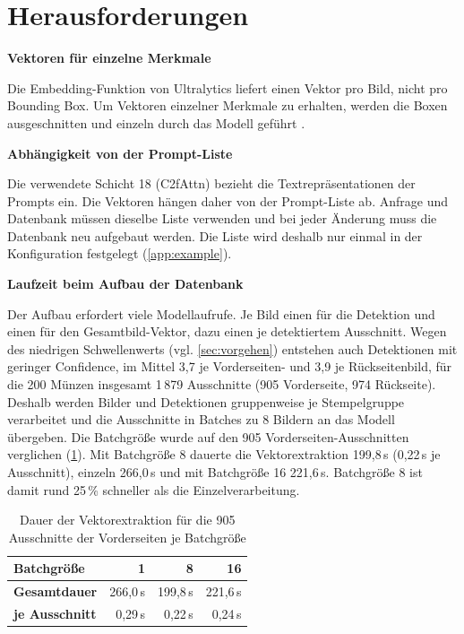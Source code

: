 \section{Herausforderungen}
\label{sec:herausforderungen}
\textbf{Vektoren für einzelne Merkmale}

\noindent Die Embedding-Funktion von Ultralytics liefert einen Vektor pro Bild, nicht pro Bounding Box. Um Vektoren einzelner Merkmale zu erhalten, werden die Boxen ausgeschnitten und einzeln durch das Modell geführt .

\vspace{\baselineskip}

\noindent \textbf{Abhängigkeit von der Prompt-Liste}

\noindent Die verwendete Schicht 18 (C2fAttn) bezieht die Textrepräsentationen der Prompts ein. Die Vektoren hängen daher von der Prompt-Liste ab. Anfrage und Datenbank müssen dieselbe Liste verwenden und bei jeder Änderung muss die Datenbank neu aufgebaut werden. Die Liste wird deshalb nur einmal in der Konfiguration festgelegt (\cref{app:example}).

\vspace{\baselineskip}

\noindent \textbf{Laufzeit beim Aufbau der Datenbank}

\noindent Der Aufbau erfordert viele Modellaufrufe. Je Bild einen für die Detektion und einen für den Gesamtbild-Vektor, dazu einen je detektiertem Ausschnitt. Wegen des niedrigen Schwellenwerts (vgl. \cref{sec:vorgehen}) entstehen auch Detektionen mit geringer Confidence, im Mittel 3{,}7 je Vorderseiten- und 3{,}9 je Rückseitenbild, für die 200 Münzen insgesamt 1\,879 Ausschnitte (905 Vorderseite, 974 Rückseite). Deshalb werden Bilder und Detektionen gruppenweise je Stempelgruppe verarbeitet und die Ausschnitte in Batches zu 8 Bildern an das Modell übergeben. Die Batchgröße wurde auf den 905 Vorderseiten-Ausschnitten verglichen (\cref{tab:batchgroessen}). Mit Batchgröße 8 dauerte die Vektorextraktion 199,8\,s (0,22\,s je Ausschnitt), einzeln 266,0\,s und mit Batchgröße 16 221,6\,s. Batchgröße 8 ist damit rund 25\,\% schneller als die Einzelverarbeitung. 

\begin{table}[H]
\centering
\small
\caption{Dauer der Vektorextraktion für die 905 Ausschnitte der Vorderseiten je Batchgröße}
\label{tab:batchgroessen}
\begin{tabular}{|l|r|r|r|}
\hline
\textbf{Batchgröße} & \textbf{1} & \textbf{8} & \textbf{16} \\ \hline
\textbf{Gesamtdauer} & 266{,}0\,s & 199{,}8\,s & 221{,}6\,s \\ \hline
\textbf{je Ausschnitt} & 0{,}29\,s & 0{,}22\,s & 0{,}24\,s \\ \hline
\end{tabular}
\end{table}


